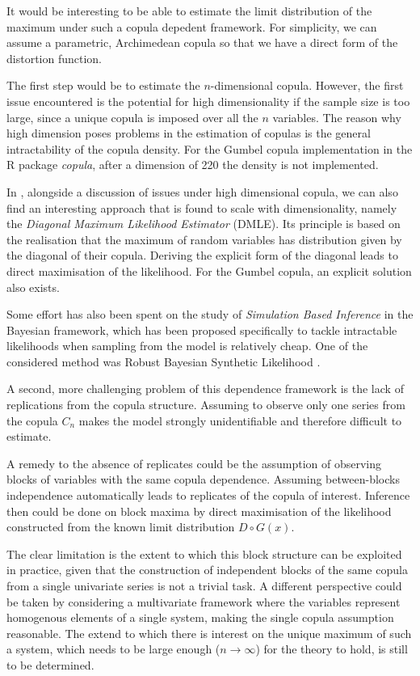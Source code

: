 \documentclass[11pt, a4paper]{article}
\begin{document}
It would be interesting to be able to estimate the limit distribution of the maximum under such a copula depedent framework. For simplicity, we can assume a parametric, Archimedean copula so that we have a direct form of the distortion function.

The first step would be to estimate the $n$-dimensional copula. However, the first issue encountered is the potential for high dimensionality if the sample size is too large, since a unique copula is imposed over all the $n$ variables. The reason why high dimension poses problems in the estimation of copulas is the general intractability of the copula density. For the Gumbel copula implementation in the R package \textit{copula}, after a dimension of 220 the density is not implemented.

In \textcite{hofert2013}, alongside a discussion of issues under high dimensional copula, we can also find an interesting approach that is found to scale with dimensionality, namely the \textit{Diagonal Maximum Likelihood Estimator} (DMLE). Its principle is based on the realisation that the maximum of random variables has distribution given by the diagonal of their copula. Deriving the explicit form of the diagonal leads to direct maximisation of the likelihood. For the Gumbel copula, an explicit solution also exists.

Some effort has also been spent on the study of \textit{Simulation Based Inference} in the Bayesian framework, which has been proposed specifically to tackle intractable likelihoods when sampling from the model is relatively cheap. One of the considered method was Robust Bayesian Synthetic Likelihood \parencite{an2020}.

A second, more challenging problem of this dependence framework is the lack of replications from the copula structure. Assuming to observe only one series from the copula $C_n$ makes the model strongly unidentifiable and therefore difficult to estimate.

A remedy to the absence of replicates could be the assumption of observing blocks of variables with the same copula dependence. Assuming between-blocks independence automatically leads to replicates of the copula of interest. Inference then could be done on block maxima by direct maximisation of the likelihood constructed from the known limit distribution $D \circ G(x)$.

The clear limitation is the extent to which this block structure can be exploited in practice, given that the construction of independent blocks of the same copula from a single univariate series is not a trivial task. A different perspective could be taken by considering a multivariate framework where the variables represent homogenous elements of a single system, making the single copula assumption reasonable. The extend to which there is interest on the unique maximum of such a system, which needs to be large enough ($n \to \infty$) for the theory to hold, is still to be determined.
\end{document}
